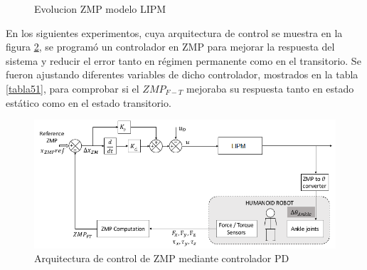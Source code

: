 \begin{figure}[H]
\centering
{}
\quad
{}
\caption{Evolucion ZMP modelo LIPM}
\label{figura55}
\end{figure}

En los siguientes experimentos, cuya arquitectura de control se muestra en la figura \ref{figura56}, se programó un controlador en ZMP para mejorar la respuesta del sistema y reducir el error tanto en régimen permanente como en el transitorio. Se fueron ajustando diferentes variables de dicho controlador, mostrados en la tabla \ref{tabla51}, para comprobar si el $ZMP_{F-T}$ mejoraba su respuesta tanto en estado estático como en el estado transitorio. 

\begin{figure}[H]
\centering
\includegraphics[scale=0.6]{imagenes/apartado_5/56_esquema_bucle_cerrado}
\caption{Arquitectura de control de ZMP mediante controlador PD}
\label{figura56}
\end{figure}


